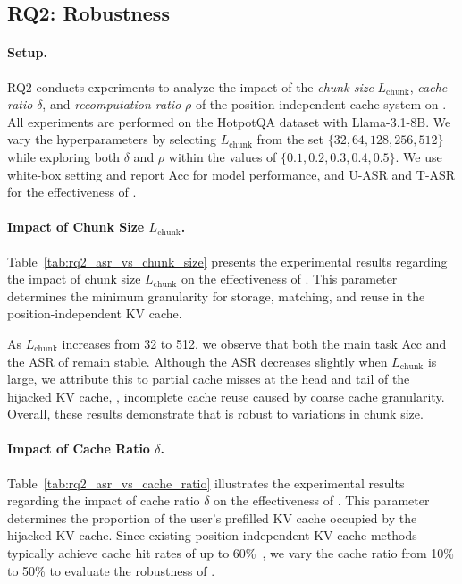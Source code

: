 \subsection{RQ2: Robustness}

\paragraph{Setup.} RQ2 conducts experiments to analyze the impact of the \textit{chunk size} $L_{\mathrm{chunk}}$, \textit{cache ratio} $\delta$, and \textit{recomputation ratio} $\rho$ of the position-independent cache system on \sys.
% 
All experiments are performed on the HotpotQA dataset with Llama-3.1-8B. We vary the hyperparameters by selecting $L_{\mathrm{chunk}}$ from the set $\{32, 64, 128, 256, 512\}$ while exploring both $\delta$ and $\rho$ within the values of $\{0.1, 0.2, 0.3, 0.4, 0.5\}$. We use white-box setting and report Acc for model performance, and U-ASR and T-ASR for the effectiveness of \sys.






\paragraph{Impact of Chunk Size $L_{\mathrm{chunk}}$.} 
Table~\ref{tab:rq2_asr_vs_chunk_size} presents the experimental results regarding the impact of chunk size $L_{\mathrm{chunk}}$ on the effectiveness of \sys. This parameter determines the minimum granularity for storage, matching, and reuse in the position-independent KV cache.

As $L_{\text{chunk}}$ increases from 32 to 512, we observe that both the main task Acc and the ASR of \sys remain stable. Although the ASR decreases slightly when $L_{\text{chunk}}$ is large, we attribute this to partial cache misses at the head and tail of the hijacked KV cache, \ie, incomplete cache reuse caused by coarse cache granularity. Overall, these results demonstrate that \sys is robust to variations in chunk size.

\paragraph{Impact of Cache Ratio $\delta$.} Table~\ref{tab:rq2_asr_vs_cache_ratio} illustrates the experimental results regarding the impact of cache ratio $\delta$ on the effectiveness of \sys. This parameter determines the proportion of the user's prefilled KV cache occupied by the hijacked KV cache.
% 
Since existing position-independent KV cache methods typically achieve cache hit rates of up to 60\%~\cite{yang2025kvshare}, we vary the cache ratio from 10\% to 50\% to evaluate the robustness of \sys.


